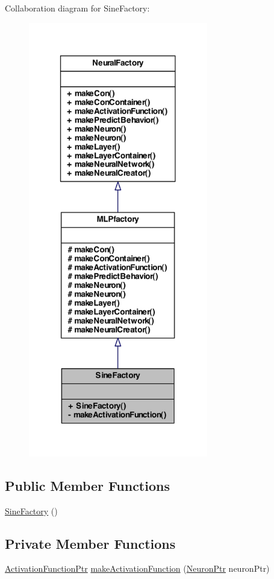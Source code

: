 Collaboration diagram for SineFactory:\nopagebreak
\begin{figure}[H]
\begin{center}
\leavevmode
\includegraphics[width=222pt]{class_sine_factory__coll__graph}
\end{center}
\end{figure}
\subsection*{Public Member Functions}
\begin{DoxyCompactItemize}
\item 
\hyperlink{class_sine_factory_a52f4a786cbd7384515e7ff0e6e4099d5}{SineFactory} ()
\end{DoxyCompactItemize}
\subsection*{Private Member Functions}
\begin{DoxyCompactItemize}
\item 
\hyperlink{_a_m_o_r_e_8h_a77602a0277a02e5769c3df0adc669b17}{ActivationFunctionPtr} \hyperlink{class_sine_factory_aca81bca10dbcac538f58209270ebd26d}{makeActivationFunction} (\hyperlink{_a_m_o_r_e_8h_ac1ea936c2c7728eb382278131652fef4}{NeuronPtr} neuronPtr)
\end{DoxyCompactItemize}


